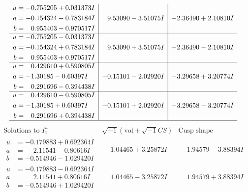\documentclass[1p]{elsarticle_modified}
\theoremstyle{definition}
\newcommand{\I}{\sqrt{-1}}
\begin{document}
$$\begin{array}{c|c|c}
\begin{aligned}
u &= -0.755205 + 0.031373 I \\
a &= -0.154324 - 0.783184 I \\
b &= \phantom{-}0.955403 - 0.970517 I\end{aligned}
 & \phantom{-}9.53090 - 3.51075 I & -2.36490 + 2.10810 I \\ \hline\begin{aligned}
u &= -0.755205 - 0.031373 I \\
a &= -0.154324 + 0.783184 I \\
b &= \phantom{-}0.955403 + 0.970517 I\end{aligned}
 & \phantom{-}9.53090 + 3.51075 I & -2.36490 - 2.10810 I \\ \hline\begin{aligned}
u &= \phantom{-}0.429610 + 0.590805 I \\
a &= -1.30185 - 0.60397 I \\
b &= \phantom{-}0.291696 - 0.394438 I\end{aligned}
 & -0.15101 - 2.02920 I & -3.29658 + 3.20774 I \\ \hline\begin{aligned}
u &= \phantom{-}0.429610 - 0.590805 I \\
a &= -1.30185 + 0.60397 I \\
b &= \phantom{-}0.291696 + 0.394438 I\end{aligned}
 & -0.15101 + 2.02920 I & -3.29658 - 3.20774 I\\
 \hline 
 \end{array}$$\newpage$$\begin{array}{c|c|c}  
\text{Solutions to }I^u_{1}& \I (\text{vol} + \sqrt{-1}CS) & \text{Cusp shape}\\
 \hline 
\begin{aligned}
u &= -0.179883 + 0.692364 I \\
a &= \phantom{-}2.11541 - 0.80616 I \\
b &= -0.514946 - 1.029420 I\end{aligned}
 & \phantom{-}1.04465 + 3.25872 I & \phantom{-}1.94579 - 3.88394 I \\ \hline\begin{aligned}
u &= -0.179883 - 0.692364 I \\
a &= \phantom{-}2.11541 + 0.80616 I \\
b &= -0.514946 + 1.029420 I\end{aligned}
 & \phantom{-}1.04465 - 3.25872 I & \phantom{-}1.94579 + 3.88394 I \\ \hline\begin{aligned}

\end{aligned}
\end{array}$$
\end{document}
